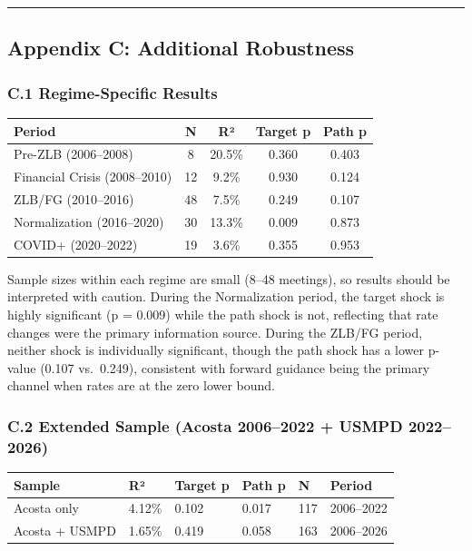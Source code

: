 \documentclass[12pt]{article}
\begin{document}
\begin{center}\rule{0.5\linewidth}{0.5pt}\end{center}

\subsection{Appendix C: Additional
Robustness}\label{appendix-c-additional-robustness}

\subsubsection{C.1 Regime-Specific
Results}\label{c.1-regime-specific-results}

\begin{longtable}[]{@{}lcccc@{}}
\toprule\noalign{}
Period & N & R² & Target p & Path p \\
\midrule\noalign{}
\endhead
\bottomrule\noalign{}
\endlastfoot
Pre-ZLB (2006--2008) & 8 & 20.5\% & 0.360 & 0.403 \\
Financial Crisis (2008--2010) & 12 & 9.2\% & 0.930 & 0.124 \\
ZLB/FG (2010--2016) & 48 & 7.5\% & 0.249 & 0.107 \\
Normalization (2016--2020) & 30 & 13.3\% & 0.009 & 0.873 \\
COVID+ (2020--2022) & 19 & 3.6\% & 0.355 & 0.953 \\
\end{longtable}

Sample sizes within each regime are small (8--48 meetings), so results
should be interpreted with caution. During the Normalization period, the
target shock is highly significant (p = 0.009) while the path shock is
not, reflecting that rate changes were the primary information source.
During the ZLB/FG period, neither shock is individually significant,
though the path shock has a lower p-value (0.107 vs.~0.249), consistent
with forward guidance being the primary channel when rates are at the
zero lower bound.

\subsubsection{C.2 Extended Sample (Acosta 2006--2022 + USMPD
2022--2026)}\label{c.2-extended-sample-acosta-20062022-usmpd-20222026}

\begin{longtable}[]{@{}llllll@{}}
\toprule\noalign{}
Sample & R² & Target p & Path p & N & Period \\
\midrule\noalign{}
\endhead
\bottomrule\noalign{}
\endlastfoot
Acosta only & 4.12\% & 0.102 & 0.017 & 117 & 2006--2022 \\
Acosta + USMPD & 1.65\% & 0.419 & 0.058 & 163 & 2006--2026 \\
\end{longtable}
\end{document}
